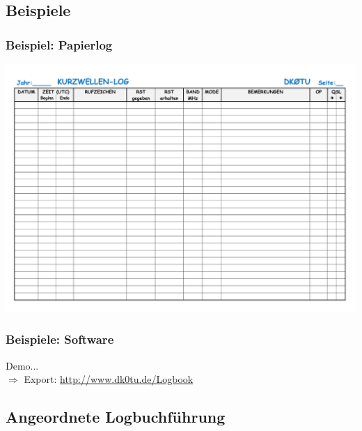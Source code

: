 \subsection{Beispiele}

\begin{frame}
    \frametitle{Beispiel: Papierlog}

    \begin{center}
        \includegraphics[height=.9\textheight]{bv13/dk0tu_log_kw.png}
    \end{center}

\end{frame}

\begin{frame}
    \frametitle{Beispiele: Software}
 
    \begin{center}

    \Large Demo... \\[3em]

    \normalsize $\Rightarrow$ Export: \url{http://www.dk0tu.de/Logbook}

    \end{center}

\end{frame}

\subsection{Angeordnete Logbuchführung}

